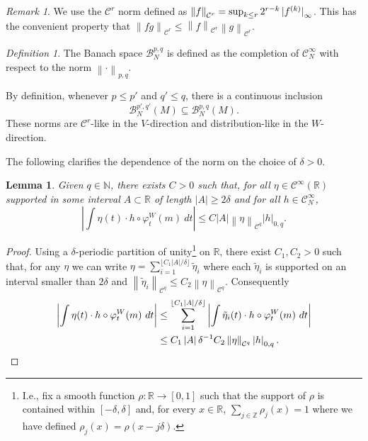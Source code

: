 \documentclass[a4paper,11pt]{amsart}
\newtheorem{lemma}[theorem]{Lemma}
\theoremstyle{remark}
\newtheorem{definition}[theorem]{Definition}
\newtheorem{remark}[theorem]{Remark}
\newcommand{\abs}[1]{\left|#1\right|} %
\newcommand{\cB}{\mathcal{B}} %
\newcommand{\cC}{\mathcal{C}} %
\newcommand{\bN}{\mathbb{N}} %
\newcommand{\bR}{\mathbb{R}} %
\newcommand{\bZ}{\mathbb{Z}} %
\newcommand{\norm}[1]{\left\|#1\right\|} %
\newcommand{\dv}{V} %
\newcommand{\dw}{W} %
\begin{document}
\begin{remark}
    We use the \(\cC^r\) norm defined as \(\norm{f}_{\cC^r} = \sup_{k\leq r} 2^{r-k} \abs{\smash{f^{(k)}}}_{\infty} \).
    This has the convenient property that \(\norm{f g}_{\cC^r} \leq \norm{f}_{\cC^r} \norm{g}_{\cC^r}\).
\end{remark}

\begin{definition}
    \label{def:Bpq}
    The Banach space \(\cB_{N}^{p,q}\) is defined as the completion of \(\cC_N^\infty\) with respect to the norm $\norm{\cdot}_{p,q}.$  
\end{definition}

By definition, whenever \(p\leq p'\) and \(q'\leq q\), there is a continuous inclusion 
\begin{equation}
    \label{eq:continuous}
    \cB_{N}^{p',q'}(M) \subseteq \cB_{N}^{p,q}(M).
\end{equation}
These norms are \(\cC^r\)-like in the \(\dv\)-direction and distribution-like in the \(\dw\)-direction.

The following clarifies the dependence of the norm on the choice of \(\delta > 0\).

\begin{lemma}
    \label{lem:norm-scale}
    Given \(q\in \bN\), there exists \(C>0\) such that, for all \(\eta \in \cC^{\infty}(\bR)\) supported in some interval \(A \subset \bR\) of length \(\abs{A} \geq 2\delta\) and for all \(h\in \cC^{\infty}_{N}\),
    \[
        \abs{\int \eta(t) \cdot  h\circ \varphi_{t}^{\dw}(m) \ dt}
        \leq C \abs{A} \norm{\eta}_{\cC^q} \abs{h}_{0,q}.
    \]
\end{lemma}

\begin{proof}
    Using a $\delta$-periodic partition of unity\footnote{I.e., fix a smooth function \(\rho : \bR \to [0,1]\) such that the support of \(\rho\) is contained within \([-\delta,\delta]\) and, for every \(x \in \bR\), \(\sum_{j\in \bZ} \rho_j(x) = 1\) where we have defined \(\rho_j(x) = \rho(x-j\delta)\).} on $\bR$, there exist $C_1,C_2>0$ such that, for any \(\eta\) we can write
    \(\eta = \sum_{i= 1}^{\lfloor C_1 \abs{A}/\delta \rfloor} \tilde{\eta}_{i}\)
    where each \(\tilde{\eta}_{i}\) is supported on an interval smaller than \(2 \delta\) and \(  \norm{\tilde{\eta}_{i}}_{\cC^{q}}\leq C_2  \norm{\eta}_{\cC^q}\).
    Consequently
    \begin{align*}
        \abs{\int \eta(t) \cdot  h\circ \varphi_{t}^{\dw}(m) \ dt}
         & \leq \sum_{i= 1}^{\lfloor C_1 \abs{A}/\delta \rfloor}  \abs{\int \tilde{\eta}_{i}(t) \cdot  h\circ \varphi_{t}^{\dw}(m) \ dt} \\
         & \leq C_1 \abs{A} \delta^{-1} C_2 \norm{\eta}_{\cC^q} \abs{h}_{0,q}.  \qedhere
    \end{align*}
\end{proof}
\end{document}
